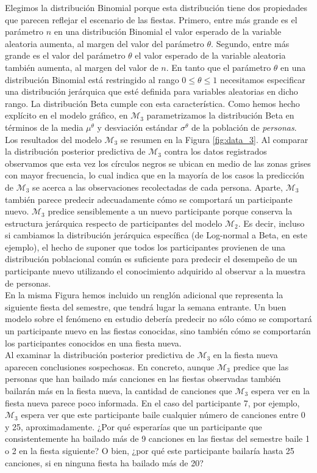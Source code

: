 \documentclass{article}
\begin{document}
\indent Elegimos la distribución Binomial porque esta distribución tiene dos propiedades que parecen reflejar el escenario de las fiestas. Primero, entre más grande es el parámetro $n$ en una distribución Binomial el valor esperado de la variable aleatoria aumenta, al margen del valor del parámetro $\theta$. Segundo, entre más grande es el valor del parámetro $\theta$ el valor esperado de la variable aleatoria también aumenta, al margen del valor de $n$. En tanto que el parámetro $\theta$ en una distribución Binomial está restringido al rango $0\leq\theta\leq1$ necesitamos especificar una distribución jerárquica que esté definida para variables aleatorias en dicho rango. La distribución Beta cumple con esta característica. Como hemos hecho explícito en el modelo gráfico, en $\mathcal M_3$ parametrizamos la distribución Beta en términos de la media $\mu^\theta$ y desviación estándar $\sigma^\theta$ de la población de \emph{personas}.\\ 
\indent Los resultados del modelo $\mathcal M_3$ se resumen en la Figura \ref{fig:data_3}. Al comparar la distribución posterior predictiva de $\mathcal M_3$ contra los datos registrados observamos que esta vez los círculos negros se ubican en medio de las zonas grises con mayor frecuencia, lo cual indica que en la mayoría de los casos la predicción de $\mathcal M_3$ se acerca a las observaciones recolectadas de cada persona. Aparte, $\mathcal M_3$ también parece predecir adecuadamente cómo se comportará un participante nuevo. $\mathcal M_3$ predice sensiblemente a un nuevo participante porque conserva la estructura jerárquica respecto de participantes del modelo $\mathcal M_2$. Es decir, incluso si cambiamos la distribución jerárquica específica (de Log-normal a Beta, en este ejemplo), el hecho de suponer que todos los participantes provienen de una distribución poblacional común es suficiente para predecir el desempeño de un participante nuevo utilizando el conocimiento adquirido al observar a la muestra de personas.\\
\indent En la misma Figura hemos incluido un renglón adicional que representa la siguiente fiesta del semestre, que tendrá lugar la semana entrante. Un buen modelo sobre el fenómeno en estudio debería predecir no sólo cómo se comportará un participante nuevo en las fiestas conocidas, sino también cómo se comportarán los participantes conocidos en una fiesta nueva.\\
\indent Al examinar la distribución posterior predictiva de $\mathcal M_3$ en la fiesta nueva aparecen conclusiones sospechosas. En concreto, aunque $\mathcal M_3$ predice que las personas que han bailado más canciones en las fiestas observadas también bailarán más en la fiesta nueva, la cantidad de canciones que $\mathcal M_3$ espera ver en la fiesta nueva parece poco informada. En el caso del participante 7, por ejemplo, $\mathcal M_3$ espera ver que este participante baile cualquier número de canciones entre 0 y 25, aproximadamente. ¿Por qué esperarías que un participante que consistentemente ha bailado más de 9 canciones en las fiestas del semestre baile 1 o 2 en la fiesta siguiente? O bien, ¿por qué este participante bailaría hasta 25 canciones, si en ninguna fiesta ha bailado más de 20?\\
\end{document}
